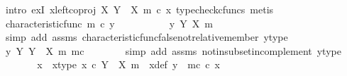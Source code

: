 \begin{isabellebody}
\ {\isacharparenleft}{\kern0pt}intro\ exI{\isacharbrackleft}{\kern0pt}\ x{\isacharequal}{\kern0pt}{\isachardoublequoteopen}left{\isacharunderscore}{\kern0pt}coproj\ X\ {\isacharparenleft}{\kern0pt}Y\ {\isasymsetminus}\ {\isacharparenleft}{\kern0pt}X{\isacharcomma}{\kern0pt}\ m{\isacharparenright}{\kern0pt}{\isacharparenright}{\kern0pt}\ {\isasymcirc}\isactrlsub c\ x{\isachardoublequoteclose}{\isacharbrackright}{\kern0pt}{\isacharcomma}{\kern0pt}\ typecheck{\isacharunderscore}{\kern0pt}cfuncs{\isacharcomma}{\kern0pt}\ metis{\isacharparenright}{\kern0pt}\isanewline
\ \ \isamarkupfalse%
\isanewline
\ \ \ \ \isamarkupfalse%
\ {\isachardoublequoteopen}characteristic{\isacharunderscore}{\kern0pt}func\ m\ {\isasymcirc}\isactrlsub c\ y\ {\isacharequal}{\kern0pt}\ {\isasymf}{\isachardoublequoteclose}\isanewline
\ \ \ \ \isamarkupfalse%
\ \isamarkupfalse%
\ {\isachardoublequoteopen}{\isasymnot}\ y\ {\isasymin}\isactrlbsub Y\isactrlesub \ {\isacharparenleft}{\kern0pt}X{\isacharcomma}{\kern0pt}\ m{\isacharparenright}{\kern0pt}{\isachardoublequoteclose}\isanewline
\ \ \ \ \ \ \isamarkupfalse%
\ {\isacharparenleft}{\kern0pt}simp\ add{\isacharcolon}{\kern0pt}\ assms\ characteristic{\isacharunderscore}{\kern0pt}func{\isacharunderscore}{\kern0pt}false{\isacharunderscore}{\kern0pt}not{\isacharunderscore}{\kern0pt}relative{\isacharunderscore}{\kern0pt}member\ y{\isacharunderscore}{\kern0pt}type{\isacharparenright}{\kern0pt}\isanewline
\ \ \ \ \isamarkupfalse%
\ \isamarkupfalse%
\ {\isachardoublequoteopen}y\ {\isasymin}\isactrlbsub Y\isactrlesub \ {\isacharparenleft}{\kern0pt}Y\ {\isasymsetminus}\ {\isacharparenleft}{\kern0pt}X{\isacharcomma}{\kern0pt}\ m{\isacharparenright}{\kern0pt}{\isacharcomma}{\kern0pt}\ m\isactrlsup c{\isacharparenright}{\kern0pt}{\isachardoublequoteclose}\isanewline
\ \ \ \ \ \ \isamarkupfalse%
\ {\isacharparenleft}{\kern0pt}simp\ add{\isacharcolon}{\kern0pt}\ assms\ not{\isacharunderscore}{\kern0pt}in{\isacharunderscore}{\kern0pt}subset{\isacharunderscore}{\kern0pt}in{\isacharunderscore}{\kern0pt}complement\ y{\isacharunderscore}{\kern0pt}type{\isacharparenright}{\kern0pt}\isanewline
\ \ \ \ \isamarkupfalse%
\ \isamarkupfalse%
\ x{\isacharprime}{\kern0pt}\ \ x{\isacharprime}{\kern0pt}{\isacharunderscore}{\kern0pt}type{\isacharcolon}{\kern0pt}\ {\isachardoublequoteopen}x{\isacharprime}{\kern0pt}\ {\isasymin}\isactrlsub c\ Y\ {\isasymsetminus}\ {\isacharparenleft}{\kern0pt}X{\isacharcomma}{\kern0pt}\ m{\isacharparenright}{\kern0pt}{\isachardoublequoteclose}\ \ x{\isacharprime}{\kern0pt}{\isacharunderscore}{\kern0pt}def{\isacharcolon}{\kern0pt}\ {\isachardoublequoteopen}y\ {\isacharequal}{\kern0pt}\ m\isactrlsup c\ {\isasymcirc}\isactrlsub c\ x{\isacharprime}{\kern0pt}{\isachardoublequoteclose}\isanewline

\end{isabellebody}
